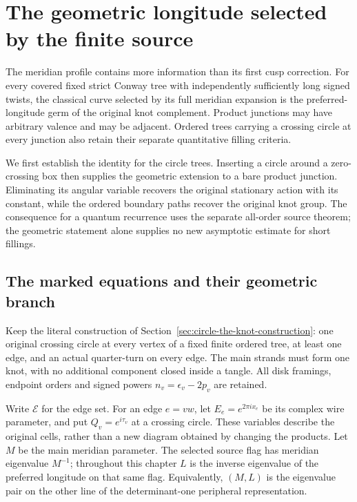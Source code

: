 \chapter{The geometric longitude selected by the finite source}
\label{gc:chapter}

The meridian profile contains more information than its first cusp
correction. For every covered fixed strict Conway tree with
independently sufficiently long signed twists, the classical curve
selected by its full meridian expansion is the preferred-longitude
germ of the original knot complement. Product junctions may have arbitrary valence and
may be adjacent. Ordered trees carrying a crossing circle at every
junction also retain their separate quantitative filling criteria.

We first establish the identity for the circle trees. Inserting a
circle around a zero-crossing box then supplies the geometric
extension to a bare product junction. Eliminating its angular
variable recovers the original stationary action with its constant,
while the ordered boundary paths recover the original knot group.
The consequence for a quantum recurrence uses the separate all-order
source theorem; the geometric statement alone supplies no new
asymptotic estimate for short fillings.

\section{The marked equations and their geometric branch}
\label{gc:equations}

Keep the literal construction of
Section~\ref{sec:circle-the-knot-construction}: one original crossing
circle at every vertex of a fixed finite ordered tree, at least one
edge, and an actual quarter-turn on every edge. The main strands must
form one knot, with no additional component closed inside a tangle.
All disk framings, endpoint orders and signed powers
$n_v=\epsilon_v-2p_v$ are retained.

Write $\mathcal E$ for the edge set. For an edge $e=vw$, let
$E_e=e^{2\pi i x_e}$ be its complex wire parameter, and put
$Q_v=e^{i\tau_v}$ at a crossing circle. These variables describe
the original cells, rather than a new diagram obtained by changing
the products. Let $M$ be the main meridian parameter. The selected
source flag has meridian eigenvalue $M^{-1}$; throughout this
chapter $L$ is the inverse eigenvalue of the preferred longitude
on that same flag. Equivalently, $(M,L)$ is the eigenvalue pair
on the other line of the determinant-one peripheral representation.

